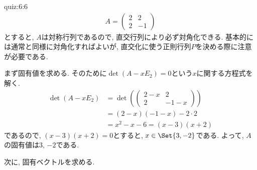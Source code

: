 \begin{answerof}{quiz:6:6}
  \begin{align*}
    A=
    \begin{pmatrix}
      2&2\\2&-1
    \end{pmatrix}
  \end{align*}
  とすると, $A$は対称行列であるので,
  直交行列により必ず対角化できる.
  基本的には通常と同様に対角化すればよいが,
  直交化に使う正則行列$P$を決める際に注意が必要である.

  まず固有値を求める.
  そのために$\det(A-xE_2)=0$という$x$に関する方程式を解く.
  \begin{align*}
    \det(A-xE_2)
    &=\det(
    \begin{pmatrix}
      2-x&2\\2&-1-x
    \end{pmatrix})\\
    &=(2-x)(-1-x)-2\cdot 2\\
    &=x^2-x-6
    =(x-3)(x+2)
  \end{align*}
  であるので, $(x-3)(x+2)=0$とすると, $x\in\Set{3,-2}$である.
  よって, $A$の固有値は$3$, $-2$である.

  次に, 固有ベクトルを求める.


\end{answerof}
